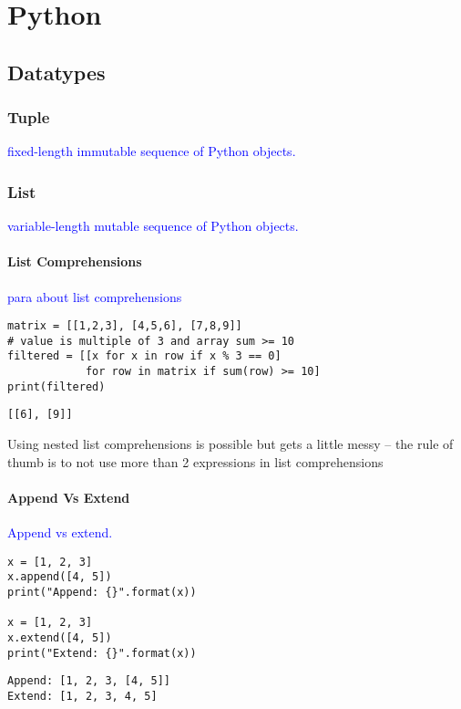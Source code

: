 \section{Python}

\subsection{Datatypes}

\subsubsection{Tuple}

\textcolor{blue}{fixed-length immutable sequence of Python objects.}

\subsubsection{List}

\textcolor{blue}{variable-length mutable sequence of Python objects.}

\paragraph{List Comprehensions}

\textcolor{blue}{para about list comprehensions}

\begin{lstlisting}[style=pyInStyle]
matrix = [[1,2,3], [4,5,6], [7,8,9]]
# value is multiple of 3 and array sum >= 10
filtered = [[x for x in row if x % 3 == 0]
            for row in matrix if sum(row) >= 10]
print(filtered)
\end{lstlisting}
\begin{lstlisting}[style=pyOutStyle]
[[6], [9]]
\end{lstlisting}
\begin{markdown}
Using nested list comprehensions is possible but gets a little messy -- the rule of thumb is to not use more than 2 expressions in list comprehensions
\end{markdown}

\paragraph{Append Vs Extend}

\textcolor{blue}{Append vs extend.}

\begin{lstlisting}[style=pyInStyle]
x = [1, 2, 3]
x.append([4, 5])
print("Append: {}".format(x))

x = [1, 2, 3]
x.extend([4, 5])
print("Extend: {}".format(x))
\end{lstlisting}
\begin{lstlisting}[style=pyOutStyle]
Append: [1, 2, 3, [4, 5]]
Extend: [1, 2, 3, 4, 5]
\end{lstlisting}


